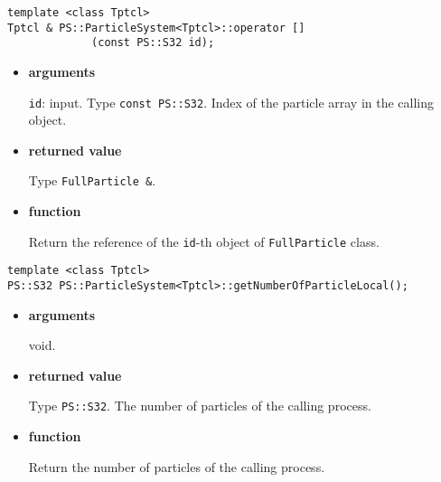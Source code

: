 
\begin{screen}
\begin{verbatim}
template <class Tptcl>
Tptcl & PS::ParticleSystem<Tptcl>::operator []
             (const PS::S32 id);
\end{verbatim}
\end{screen}

\begin{itemize}

\item {\bf arguments}

{\tt id}: input. Type {\tt const PS::S32}. Index of the particle array in the calling object.

\item {\bf returned value}

Type {\tt FullParticle \&}.


\item {\bf function}

Return the reference of the {\tt id}-th object of {\tt FullParticle} class.


\end{itemize}




\begin{screen}
\begin{verbatim}
template <class Tptcl>
PS::S32 PS::ParticleSystem<Tptcl>::getNumberOfParticleLocal();
\end{verbatim}
\end{screen}

\begin{itemize}

\item {\bf arguments}

void.

\item {\bf returned value}

Type {\tt PS::S32}. The number of particles of the calling process.


\item {\bf function}

Return the number of particles of the calling process.


\end{itemize}

